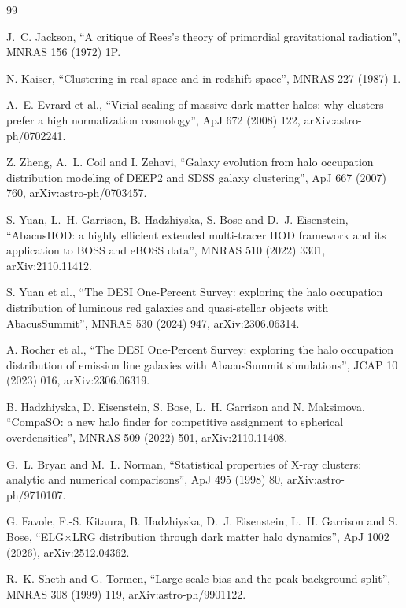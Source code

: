 \documentclass[11pt]{article}
\begin{document}
\begin{thebibliography}{99}

J.~C. Jackson,
``A critique of Rees's theory of primordial gravitational radiation'',
MNRAS 156 (1972) 1P.

N. Kaiser,
``Clustering in real space and in redshift space'',
MNRAS 227 (1987) 1.

A.~E. Evrard et al.,
``Virial scaling of massive dark matter halos: why clusters prefer a
high normalization cosmology'',
ApJ 672 (2008) 122, arXiv:astro-ph/0702241.

Z. Zheng, A.~L. Coil and I. Zehavi,
``Galaxy evolution from halo occupation distribution modeling of DEEP2
and SDSS galaxy clustering'',
ApJ 667 (2007) 760, arXiv:astro-ph/0703457.

S. Yuan, L.~H. Garrison, B. Hadzhiyska, S. Bose and D.~J. Eisenstein,
``AbacusHOD: a highly efficient extended multi-tracer HOD framework
and its application to BOSS and eBOSS data'',
MNRAS 510 (2022) 3301, arXiv:2110.11412.

S. Yuan et al.,
``The DESI One-Percent Survey: exploring the halo occupation
distribution of luminous red galaxies and quasi-stellar objects with
AbacusSummit'',
MNRAS 530 (2024) 947, arXiv:2306.06314.

A. Rocher et al.,
``The DESI One-Percent Survey: exploring the halo occupation
distribution of emission line galaxies with AbacusSummit
simulations'',
JCAP 10 (2023) 016, arXiv:2306.06319.

B. Hadzhiyska, D. Eisenstein, S. Bose, L.~H. Garrison and
N. Maksimova,
``CompaSO: a new halo finder for competitive assignment to spherical
overdensities'',
MNRAS 509 (2022) 501, arXiv:2110.11408.

G.~L. Bryan and M.~L. Norman,
``Statistical properties of X-ray clusters: analytic and numerical
comparisons'',
ApJ 495 (1998) 80, arXiv:astro-ph/9710107.

G. Favole, F.-S. Kitaura, B. Hadzhiyska, D.~J. Eisenstein,
L.~H. Garrison and S. Bose,
``ELG$\times$LRG distribution through dark matter halo dynamics'',
ApJ 1002 (2026), arXiv:2512.04362.

R.~K. Sheth and G. Tormen,
``Large scale bias and the peak background split'',
MNRAS 308 (1999) 119, arXiv:astro-ph/9901122.


\end{thebibliography}
\end{document}
